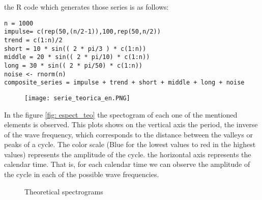 \documentclass[a4paper]{article}
\begin{document}
the R code which generates those series is as follows:

\begin{lstlisting}
n = 1000
impulse= c(rep(50,(n/2-1)),100,rep(50,n/2))
trend = c(1:n)/2
short = 10 * sin(( 2 * pi/3 ) * c(1:n))
middle = 20 * sin(( 2 * pi/10) * c(1:n))
long = 30 * sin(( 2 * pi/50) * c(1:n))
noise <- rnorm(n)
composite_series = impulse + trend + short + middle + long + noise
\end{lstlisting}


\begin{figure}[H]
	\centering
	\texttt{[image: serie\_teorica\_en.PNG]}
	\caption{} \label{fig:serie_teorica}
\end{figure}

In the figure \ref{fig: espect_teo} the spectogram of each one of the mentioned elements is observed. This plots shows on the vertical axis the period, the inverse of the wave frequency, which corresponds to the distance between the valleys or peaks of a cycle. The color scale (Blue for the lowest values to red in the highest values) represents the amplitude of the cycle. the horizontal axis represents the calendar time. That is, for each calendar time we can observe the amplitude of the cycle in each of the possible wave frequencies.


\begin{figure}[H]
	\centering
	    \vspace{0.00mm}
	    \vspace{0.00mm}
	    \vspace{0.00mm}
	    \vspace{0.00mm}
	    \vspace{0.00mm}
	    \vspace{0.00mm}
	\caption{Theoretical spectrograms} \label{fig:espect_teo}
\end{figure}
\end{document}
